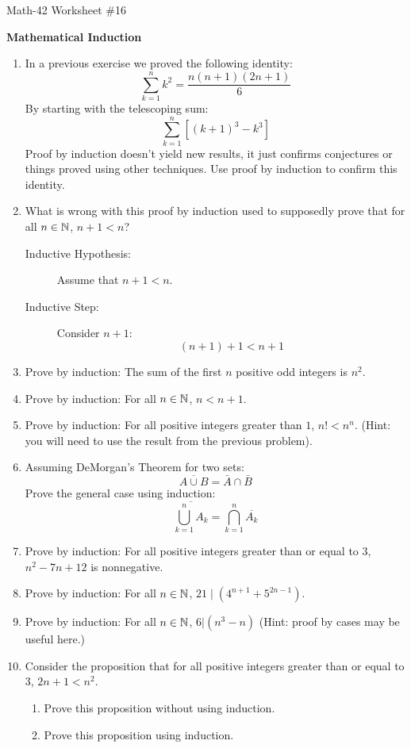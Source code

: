 \documentclass[letterpaper,12pt,fleqn]{article}
\begin{document}
\begin{center}
  \large Math-42 Worksheet \#16

  \textbf{Mathematical Induction}
\end{center}

\vspace{0.5in}

\begin{enumerate}[left=0in,itemsep=0.5in]
\item In a previous exercise we proved the following identity:
  \[\sum_{k=1}^nk^2=\frac{n(n+1)(2n+1)}{6}\]
  By starting with the telescoping sum:
  \[\sum_{k=1}^n[(k+1)^3-k^3]\]
  Proof by induction doesn't yield new results, it just confirms conjectures or things proved using other techniques.
  Use proof by induction to confirm this identity.

\item What is wrong with this proof by induction used to supposedly prove that for all \(n\in\mathbb{N}\), \(n+1<n\)?

  \begin{description}
  \item[Inductive Hypothesis:] Assume that \(n+1<n\).

  \item[Inductive Step:] Consider \(n+1\):
    \[(n+1)+1<n+1\]
  \end{description}

\item Prove by induction: The sum of the first \(n\) positive odd integers is \(n^2\).

\item Prove by induction: For all \(n\in\mathbb{N}\), \(n<n+1\).

\item Prove by induction: For all positive integers greater than \(1\), \(n!<n^n\).  (Hint: you will need to use
  the result from the previous problem).

\item Assuming DeMorgan's Theorem for two sets:
  \[\overline{A\cup B}=\bar{A}\cap\bar{B}\]
  Prove the general case using induction:
  \[\overline{\bigcup_{k=1}^nA_k}=\bigcap_{k=1}^n\overline{A_k}\]

\item Prove by induction: For all positive integers greater than or equal to \(3\), \(n^2-7n+12\) is nonnegative.

\item Prove by induction: For all \(n\in\mathbb{N}\), \(21\mid(4^{n+1}+5^{2n-1})\).

\item Prove by induction: For all \(n\in\mathbb{N}\), \(6|(n^3-n)\)  (Hint: proof by cases may be useful here.)

\item Consider the proposition that for all positive integers greater than or equal to \(3\), \(2n+1<n^2\).
  \begin{enumerate}
  \item Prove this proposition without using induction.
  \item Prove this proposition using induction.
  \end{enumerate}
\end{enumerate}
\end{document}
